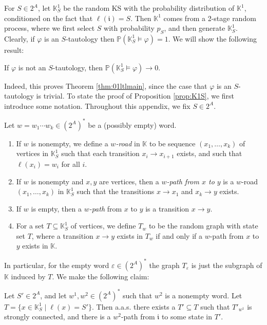 \documentclass[runngingheads]{llncs}
\newcommand{\ini}{\mathfrak{i}}
\begin{document}
For $S \in 2^A$, let $\mathbb{K}^1_S$ be the random KS with the probability distribution of $\mathbb{K}^1$, conditioned on the fact that $\ell(\ini) = S$. Then $\mathbb{K}^1$ comes from a 2-stage random process, where we first select $S$ with probability $p_S$, and then generate $\mathbb{K}^1_S$. Clearly, if $\varphi$ is an $S$-tautology then $\mathbb{P}(\mathbb{K}^1_S \models \varphi) = 1$. We will show the following result:

\begin{proposition} \label{prop:K1S}
If $\varphi$ is not an $S$-tautology, then $\mathbb{P}(\mathbb{K}^1_S \models \varphi) \rightarrow 0$.
\end{proposition}

Indeed, this proves Theorem \ref{thm:01ltlmain}, since the case that $\varphi$ is an $S$-tautology is trivial.
To state the proof of Proposition \ref{prop:K1S}, we first introduce some notation. Throughout this appendix, we fix $S \in 2^A$.

\begin{definition}
Let $w = w_1\cdots w_k \in (2^A)^*$ be a (possibly empty) word.
\begin{enumerate}
\item If $w$ is nonempty, we define a \emph{$w$-road} in $\mathbb{K}$ to be sequence $(x_1,\ldots,x_k)$ of vertices in $\mathbb{K}^1_S$ such that each transition $x_i \rightarrow x_{i+1}$ exists, and such that $\ell(x_i) = w_i$ for all $i$.
\item If $w$ is nonempty and $x,y$ are vertices, then a \emph{$w$-path from $x$ to $y$} is a $w$-road $(x_1,\ldots,x_k)$ in $\mathbb{K}^1_S$ such that the transitions $x \rightarrow x_1$ and $x_k \rightarrow y$ exists.
\item If $w$ is empty, then a \emph{$w$-path} from $x$ to $y$ is a transition $x \rightarrow y$.
\item For a set $T \subseteq \mathbb{K}^1_S$ of vertices, we define $T_{w}$ to be the random graph with state set $T$, where a transition $x \rightarrow y$ exists in $T_{w}$ if and only if a $w$-path from $x$ to $y$ exists in $\mathbb{K}$.
\end{enumerate}
\end{definition}

In particular, for the empty word $\varepsilon \in (2^A)^*$ the graph $T_{\varepsilon}$ is just the subgraph of $\mathbb{K}$ induced by $T$. We make the following claim:

\begin{proposition} \label{prop:strongcon}
Let $S' \in 2^A$, and let $w^1,w^2 \in (2^A)^*$ such that $w^2$ is a nonempty word. Let $T = \{x \in \mathbb{K}^1_S \mid \ell(x) = S'\}$. Then a.a.s. there exists a $T' \subseteq T$ such that $T'_{w^1}$ is strongly connected, and there is a $w^2$-path from $\ini$ to some state in $T'$.
\end{proposition}
\end{document}

